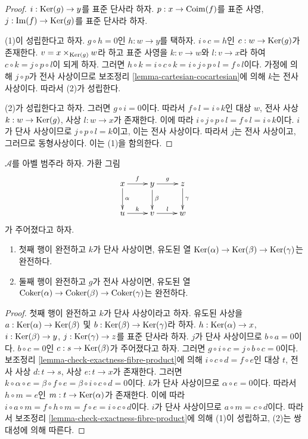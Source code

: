 \begin{proof}
$i:\mathop{\mathrm{Ker}}(g)\to y$를 표준 단사라 하자. $p:x\to\mathop{\mathrm{Coim}}(f)$를 표준 사영,
$j:\mathop{\mathrm{Im}}(f)\to\mathop{\mathrm{Ker}}(g)$를 표준 단사라 하자.

\medskip\noindent
(1)이 성립한다고 하자. $g\circ h=0$인 $h:w\to y$를 택하자.
$i\circ c=h$인 $c:w\to\mathop{\mathrm{Ker}}(g)$가 존재한다.
$v=x\times_{\mathop{\mathrm{Ker}}(g)}w$라 하고 표준 사영을 $k:v\to w$와 $l:v\to x$라
하여 $c\circ k=j\circ p\circ l$이 되게 하자. 그러면
$h\circ k=i\circ c\circ k=i\circ j\circ p\circ l=f\circ l$이다.
가정에 의해 $j\circ p$가 전사 사상이므로 보조정리
\ref{lemma-cartesian-cocartesian}에 의해 $k$는 전사 사상이다.
따라서 (2)가 성립한다.

\medskip\noindent
(2)가 성립한다고 하자. 그러면 $g\circ i=0$이다. 따라서
$f\circ l=i\circ k$인 대상 $w$, 전사 사상 $k:w\to\mathop{\mathrm{Ker}}(g)$,
사상 $l:w\to x$가 존재한다. 이에 따라
$i\circ j\circ p\circ l=f\circ l=i\circ k$이다. $i$가 단사 사상이므로
$j\circ p\circ l=k$이고, 이는 전사 사상이다.
따라서 $j$는 전사 사상이고, 그러므로 동형사상이다. 이는 (1)을 함의한다.
\end{proof}

\begin{lemma}
\label{lemma-exact-kernel-sequence}
$\mathcal{A}$를 아벨 범주라 하자. 가환 그림
$$
\xymatrix{
x \ar[r]^f \ar[d]^\alpha &
y \ar[r]^g \ar[d]^\beta &
z \ar[d]^\gamma\\
u \ar[r]^k & v \ar[r]^l & w
}
$$
가 주어졌다고 하자.
\begin{enumerate}
\item 첫째 행이 완전하고 $k$가 단사 사상이면, 유도된 열
$\mathop{\mathrm{Ker}}(\alpha) \to \mathop{\mathrm{Ker}}(\beta) \to \mathop{\mathrm{Ker}}(\gamma)$는 완전하다.
\item 둘째 행이 완전하고 $g$가 전사 사상이면, 유도된 열
$\mathop{\mathrm{Coker}}(\alpha) \to \mathop{\mathrm{Coker}}(\beta) \to \mathop{\mathrm{Coker}}(\gamma)$는 완전하다.
\end{enumerate}
\end{lemma}

\begin{proof}
첫째 행이 완전하고 $k$가 단사 사상이라고 하자. 유도된 사상을
$a:\mathop{\mathrm{Ker}}(\alpha)\to\mathop{\mathrm{Ker}}(\beta)$ 및
$b:\mathop{\mathrm{Ker}}(\beta)\to\mathop{\mathrm{Ker}}(\gamma)$라 하자. $h:\mathop{\mathrm{Ker}}(\alpha)\to x$,
$i:\mathop{\mathrm{Ker}}(\beta)\to y$, $j:\mathop{\mathrm{Ker}}(\gamma)\to z$를 표준 단사라 하자.
$j$가 단사 사상이므로 $b\circ a=0$이다. $b\circ c=0$인
$c:s\to\mathop{\mathrm{Ker}}(\beta)$가 주어졌다고 하자. 그러면
$g\circ i\circ c=j\circ b\circ c=0$이다. 보조정리
\ref{lemma-check-exactness-fibre-product}에 의해
$i\circ c\circ d=f\circ e$인 대상 $t$, 전사 사상 $d:t\to s$,
사상 $e:t\to x$가 존재한다. 그러면
$k\circ \alpha\circ e=\beta\circ f\circ e=\beta\circ i\circ c\circ d=0$이다.
$k$가 단사 사상이므로 $\alpha\circ e=0$이다. 따라서
$h\circ m=e$인 $m:t\to\mathop{\mathrm{Ker}}(\alpha)$가 존재한다. 이에 따라
$i\circ a\circ m=f\circ h\circ m=f\circ e=i\circ c\circ d$이다.
$i$가 단사 사상이므로 $a\circ m=c\circ d$이다. 따라서 보조정리
\ref{lemma-check-exactness-fibre-product}에 의해 (1)이 성립하고,
(2)는 쌍대성에 의해 따른다.
\end{proof}

